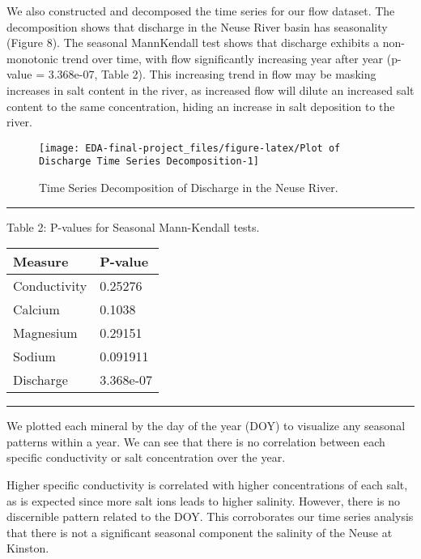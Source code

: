 \documentclass[
  12pt,
]{article}
\begin{document}
\newpage

We also constructed and decomposed the time series for our flow dataset.
The decomposition shows that discharge in the Neuse River basin has
seasonality (Figure 8). The seasonal MannKendall test shows that
discharge exhibits a non-monotonic trend over time, with flow
significantly increasing year after year (p-value = 3.368e-07, Table 2).
This increasing trend in flow may be masking increases in salt content
in the river, as increased flow will dilute an increased salt content to
the same concentration, hiding an increase in salt deposition to the
river.

\begin{figure}

{\centering \texttt{[image: EDA-final-project\_files/figure-latex/Plot of Discharge Time Series Decomposition-1]} 

}

\caption{Time Series Decomposition of Discharge in the Neuse River.}\label{fig:Plot of Discharge Time Series Decomposition}
\end{figure}

\begin{center}\rule{0.5\linewidth}{0.5pt}\end{center}

Table 2: P-values for Seasonal Mann-Kendall tests.

\begin{longtable}[]{@{}ll@{}}
\toprule
Measure & P-value \\
\midrule
\endhead
Conductivity & 0.25276 \\
Calcium & 0.1038 \\
Magnesium & 0.29151 \\
Sodium & 0.091911 \\
Discharge & 3.368e-07 \\
\bottomrule
\end{longtable}

\begin{center}\rule{0.5\linewidth}{0.5pt}\end{center}

\newpage

We plotted each mineral by the day of the year (DOY) to visualize any
seasonal patterns within a year. We can see that there is no correlation
between each specific conductivity or salt concentration over the year.

Higher specific conductivity is correlated with higher concentrations of
each salt, as is expected since more salt ions leads to higher salinity.
However, there is no discernible pattern related to the DOY. This
corroborates our time series analysis that there is not a significant
seasonal component the salinity of the Neuse at Kinston.
\end{document}
